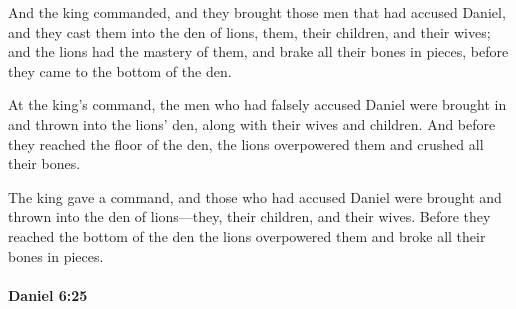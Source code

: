 			\begin{versebox}
					\item[BHS] 
					\item[LXX] 
					\item[ASV] And the king commanded, and they brought those men that had accused Daniel, and they cast them into the den of lions, them, their children, and their wives; and the lions had the mastery of them, and brake all their bones in pieces, before they came to the bottom of the den.
					\item[NIV] At the king’s command, the men who had falsely accused Daniel were brought in and thrown into the lions’ den, along with their wives and children. And before they reached the floor of the den, the lions overpowered them and crushed all their bones.
					\item[NRSV] The king gave a command, and those who had accused Daniel were brought and thrown into the den of lions—they, their children, and their wives. Before they reached the bottom of the den the lions overpowered them and broke all their bones in pieces.
			\end{versebox}

		\paragraph{Daniel 6:25} %
			\label{DANIEL-6-25}


